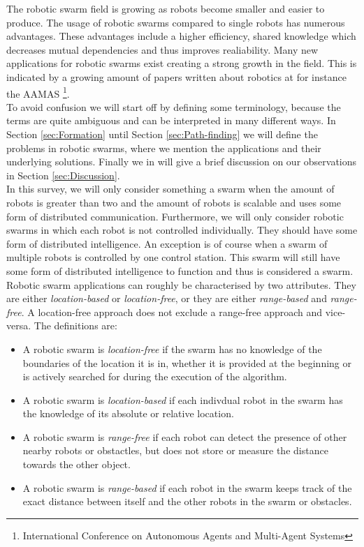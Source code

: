 The robotic swarm field is growing as robots become smaller and easier to produce.
The usage of robotic swarms compared to single robots has numerous advantages. 
These advantages include a higher efficiency, shared knowledge which decreases mutual dependencies and thus improves realiability.
Many new applications for robotic swarms exist creating a strong growth in the field.
This is indicated by a growing amount of papers written about robotics at for instance the AAMAS \footnote{International Conference on Autonomous Agents and Multi-Agent Systems}.\cite{Amigoni2014}\\

To avoid confusion we will start off by defining some terminology, because the terms are quite ambiguous and can be interpreted in many different ways.
In Section \ref{sec:Formation} until Section \ref{sec:Path-finding} we will define the problems in robotic swarms, where we mention the applications and their underlying solutions.
Finally we in will give a brief discussion on our observations in Section \ref{sec:Discussion}.\\

In this survey, we will only consider something a swarm when the amount of robots is greater than two and the amount of robots is scalable and uses some form of distributed communication.
Furthermore, we will only consider robotic swarms in which each robot is not controlled individually.
They should have some form of distributed intelligence.
An exception is of course when a swarm of multiple robots is controlled by one control station.
This swarm will still have some form of distributed intelligence to function and thus is considered a swarm.  \\

Robotic swarm applications can roughly be characterised by two attributes. They are either \emph{location-based} or \emph{location-free}, or they are either \emph{range-based} and  \emph{range-free}.
A location-free approach does not exclude a range-free approach and vice-versa. 
The definitions are:

  \begin{itemize}
    \item A robotic swarm is \emph{location-free} if the swarm has no knowledge of the boundaries of the location it is in, whether it is provided at the beginning or is actively searched for during the execution of the algorithm. 
    \item A robotic swarm is \emph{location-based} if each indivdual robot in the swarm has the knowledge of its absolute or relative location.
    \item A robotic swarm is \emph{range-free} if each robot can detect the presence of other nearby robots or obstactles, but does not store or measure the distance towards the other object.
    \item A robotic swarm is \emph{range-based} if each robot in the swarm keeps track of the exact distance between itself and the other robots in the swarm or obstacles. 
  \end{itemize}


